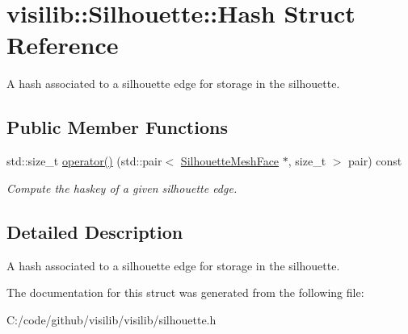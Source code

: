 \hypertarget{structvisilib_1_1_silhouette_1_1_hash}{}\section{visilib\+::Silhouette\+::Hash Struct Reference}
\label{structvisilib_1_1_silhouette_1_1_hash}


A hash associated to a silhouette edge for storage in the silhouette.  


\subsection*{Public Member Functions}
\begin{DoxyCompactItemize}
\item 
\mbox{\label{structvisilib_1_1_silhouette_1_1_hash_af79d4fadbc66f764514cfd46517f0272}} 
std\+::size\+\_\+t \mbox{\hyperlink{structvisilib_1_1_silhouette_1_1_hash_af79d4fadbc66f764514cfd46517f0272}{operator()}} (std\+::pair$<$ \mbox{\hyperlink{classvisilib_1_1_silhouette_mesh_face}{Silhouette\+Mesh\+Face}} $\ast$, size\+\_\+t $>$ pair) const
\begin{DoxyCompactList}\small\item\em Compute the haskey of a given silhouette edge. \end{DoxyCompactList}\end{DoxyCompactItemize}


\subsection{Detailed Description}
A hash associated to a silhouette edge for storage in the silhouette. 

The documentation for this struct was generated from the following file\+:\begin{DoxyCompactItemize}
\item 
C\+:/code/github/visilib/visilib/silhouette.\+h\end{DoxyCompactItemize}
